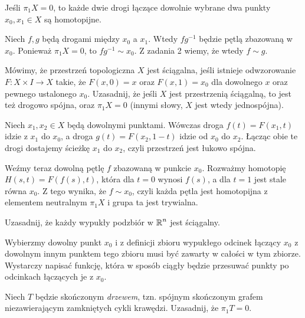 \begin{problem}
  Jeśli $\pi_1X=0$, to każde dwie drogi łączące dowolnie wybrane dwa punkty $x_0, x_1\in X$ są homotopijne.
\end{problem}

\begin{solution}
  Niech $f, g$ będą drogami między $x_0$ a $x_1$. Wtedy $fg^{-1}$ będzie pętlą zbazowaną w $x_0$. Ponieważ $\pi_1X=0$, to $fg^{-1}\sim x_0$. Z zadania 2 wiemy, że wtedy $f\sim g$.
\end{solution}

\begin{problem}
  Mówimy, że przestrzeń topologiczna $X$ jest ściągalna, jeśli istnieje odwzorowanie $F:X\times I\to X$ takie, że $F(x, 0)=x$ oraz $F(x, 1)=x_0$ dla dowolnego $x$ oraz pewnego ustalonego $x_0$. Uzasadnij, że jeśli $X$ jest przestrzenią ściągalną, to jest też drogowo spójna, oraz $\pi_1X=0$ (innymi słowy, $X$ jest wtedy jednospójna).
\end{problem}

\begin{solution}
  Niech $x_1,x_2\in X$ będą dowolnymi punktami. Wówczas droga $f(t)=F(x_1, t)$ idzie z $x_1$ do $x_0$, a droga $g(t)=F(x_2, 1-t)$ idzie od $x_0$ do $x_2$. Łącząc obie te drogi dostajemy ścieżkę $x_1$ do $x_2$, czyli przestrzeń jest łukowo spójna.

  Weźmy teraz dowolną pętlę $f$ zbazowaną w punkcie $x_0$. Rozważmy homotopię $H(s, t)=F(f(s), t)$, która dla $t=0$ wynosi $f(s)$, a dla $t=1$ jest stale równa $x_0$. Z tego wynika, że $f\sim x_0$, czyli każda pętla jest homotopijna z elementem neutralnym $\pi_1X$ i grupa ta jest trywialna.
\end{solution}

\begin{problem}
  Uzasadnij, że każdy wypukły podzbiór w $\operatorname{\mathbb{R}}^n$ jest ściągalny.
\end{problem}

\begin{solution}
  Wybierzmy dowolny punkt $x_0$ i z definicji zbioru wypukłego odcinek łączący $x_0$ z dowolnym innym punktem tego zbioru musi być zawarty w całości w tym zbiorze. Wystarczy napisać funkcję, która w sposób ciągły będzie przesuwać punkty po odcinkach łączących je z $x_0$.
\end{solution}

\begin{problem}
  Niech $T$ będzie skończonym \emph{drzewem}, tzn. spójnym skończonym grafem niezawierającym zamkniętych cykli krawędzi. Uzasadnij, że $\pi_1T=0$.
\end{problem}

